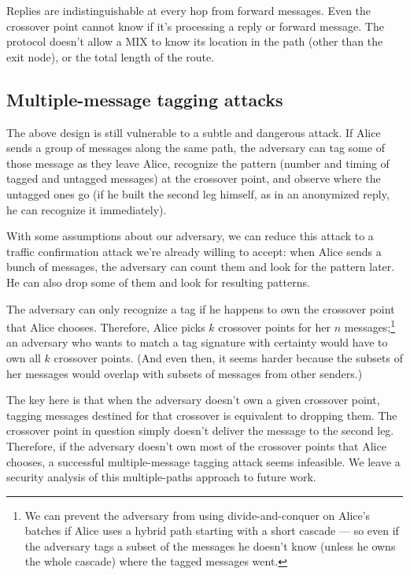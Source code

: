 \documentclass{llncs}
\begin{document}
Replies are indistinguishable at every hop from forward messages. Even the
crossover point cannot know if it's processing a reply or forward message.
The protocol doesn't allow a MIX to know its location in the path (other
than the exit node), or the total length of the route.

\subsection{Multiple-message tagging attacks}
\label{subsec:multi-tagging}

The above design is still vulnerable to a subtle and dangerous
attack. If Alice sends a group of messages along the same path, the
adversary can tag some of those message as they leave Alice, recognize
the pattern (number and timing of tagged and untagged messages) at the
crossover point, and observe where the untagged ones go (if he built
the second leg himself, as in an anonymized reply, he can recognize
it immediately).

With some assumptions about our adversary, we can reduce
this attack to a traffic confirmation attack we're already willing to
accept: when Alice sends a bunch of messages, the adversary can count
them and look for the pattern later. He can also drop some of them and
look for resulting patterns.

The adversary can only recognize a tag if he happens to own the crossover
point that Alice chooses.
Therefore, Alice picks $k$ crossover points for her $n$
messages;\footnote{
  We can prevent the adversary from using divide-and-conquer on Alice's
  batches if Alice uses a hybrid path starting with a short cascade ---
  so even if the adversary tags a subset of the messages he doesn't know
  (unless he owns the whole cascade) where the tagged messages went.
}
an adversary who wants to match a tag signature with certainty would
have to own all $k$ crossover points.  (And even then, it seems harder
because the subsets of her messages would overlap with subsets of
messages from other senders.)


The key here is that when the adversary doesn't own a given crossover
point, tagging messages destined for that crossover is equivalent to
dropping them.  The crossover point in question simply doesn't deliver
the message to the second leg. Therefore, if the adversary doesn't own
most of the crossover points that Alice chooses, a successful
multiple-message tagging attack seems infeasible.  We leave a security
analysis of this multiple-paths approach to future work.
\end{document}
